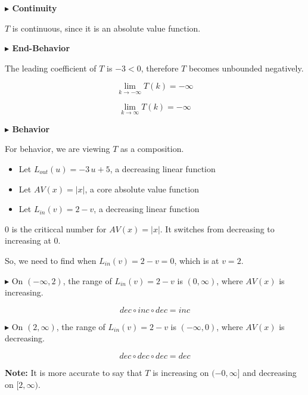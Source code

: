 \documentclass{ximera}
\begin{document}
\begin{example}
\textbf{\textcolor{blue!55!black}{$\blacktriangleright$ Continuity}} 

$T$ is continuous, since it is an absolute value function. 






\textbf{\textcolor{blue!55!black}{$\blacktriangleright$ End-Behavior}} 


The leading coefficient of $T$ is $-3 < 0$, therefore $T$ becomes unbounded negatively. 


\[
\lim\limits_{k \to -\infty} T(k) = -\infty
\]




\[
\lim\limits_{k \to \infty} T(k) = -\infty
\]









\textbf{\textcolor{blue!55!black}{$\blacktriangleright$ Behavior}} 


For behavior, we are viewing $T$ as a composition.


\begin{itemize}
\item Let $L_{out}(u) = -3 \, u + 5$, a decreasing linear function
\item Let $AV(x) = |x|$, a core absolute value function
\item Let $L_{in}(v) = 2 - v$, a decreasing linear function
\end{itemize}


$0$ is the criticcal number for $AV(x) = |x|$. It switches from decreasing to increasing at $0$.

So, we need to find when $L_{in}(v) = 2 - v = 0$, which is at $v=2$.


$\blacktriangleright$ On $(-\infty, 2)$, the range of $L_{in}(v) = 2 - v$ is  $(0, \infty)$, where $AV(x)$ is increasing.


\[ dec \circ inc \circ dec = inc \]


$\blacktriangleright$ On $(2, \infty)$, the range of $L_{in}(v) = 2 - v$ is  $(-\infty, 0)$, where $AV(x)$ is decreasing.


\[ dec \circ dec \circ dec = dec \]



\textbf{Note:} It is more accurate to say that $T$ is increasing on $(-0, \infty]$ and decreasing on $[2, \infty)$.






\end{example}
\end{document}
